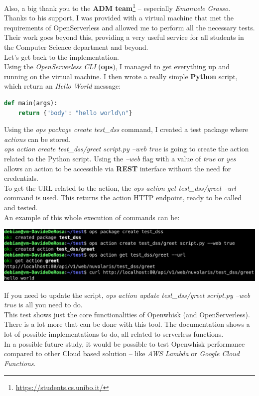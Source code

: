 Also, a big thank you to the \textbf{ADM team}\footnote{\url{https://students.cs.unibo.it/}} -- especially \textit{Emanuele Grasso}. Thanks to his support, I was provided with a virtual machine that met the requirements of OpenServerless and allowed me to perform all the necessary tests. Their work goes beyond this, providing a very useful service for all students in the Computer Science department and beyond.\vspace{14pt}\\
Let's get back to the implementation.\vspace{14pt}\\
Using the \textit{OpenServerless CLI} (\textbf{ops}), I managed to get everything up and running on the virtual machine. I then wrote a really simple \textbf{Python} script, which return an \textit{Hello World} message:
\begin{lstlisting}[language=python]
def main(args):
    return {"body": "hello world\n"}
\end{lstlisting}
Using the \textit{ops package create test\_dss} command, I created a test package where \textit{actions} can be stored.\vspace{14pt}\\
\textit{ops action create test\_dss/greet script.py --web true} is going to create the action related to the Python script. Using the \textit{--web} flag with a value of \textit{true} or \textit{yes} allows an action to be accessible via \textbf{REST} interface without the need for credentials.\vspace{14pt}\\
To get the URL related to the action, the \textit{ops action get test\_dss/greet --url} command is used. This returns the action HTTP endpoint, ready to be called and tested.\vspace{14pt}\\
An example of this whole execution of commands can be:
\begin{center}
    \includegraphics[width=1\textwidth]{img/demo.png}
\end{center}
If you need to update the script, \textit{ops action update test\_dss/greet script.py --web true} is all you need to do.\vspace{14pt}\\
This test shows just the core functionalities of Openwhisk (and OpenServerless). There is a lot more that can be done with this tool. The documentation shows a lot of possible implementations to do, all related to serverless functions.\\
In a possible future study, it would be possible to test Openwhisk performance compared to other Cloud based solution -- like \textit{AWS Lambda} or \textit{Google Cloud Functions}.